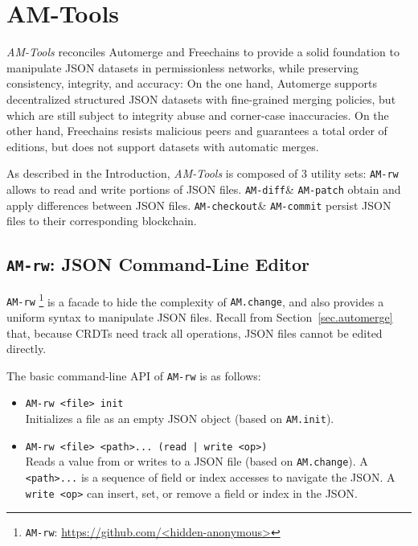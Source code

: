 \documentclass[12pt]{article}
\newcommand{\AMT}      {\emph{AM-Tools}\xspace}
\newcommand{\code}[1]  {\texttt{\footnotesize{#1}}}
\newcommand{\amrw}       {\code{AM-rw}\xspace}
\newcommand{\amdiff}     {\code{AM-diff}\xspace}
\newcommand{\ampatch}    {\code{AM-patch}\xspace}
\newcommand{\amcheckout} {\code{AM-checkout}\xspace}
\newcommand{\amcommit}   {\code{AM-commit}\xspace}
\begin{document}
\section{AM-Tools}
\label{sec.amtools}

\AMT reconciles Automerge and Freechains to provide a solid foundation to
manipulate JSON datasets in permissionless networks, while preserving
consistency, integrity, and accuracy:
%
On the one hand, Automerge supports decentralized structured JSON datasets with
fine-grained merging policies, but which are still subject to integrity abuse
and corner-case inaccuracies.
%
On the other hand, Freechains resists malicious peers and guarantees a total
order of editions, but does not support datasets with automatic merges.

As described in the Introduction, \AMT is composed of 3 utility sets:
\amrw allows to read and write portions of JSON files.
\amdiff \& \ampatch obtain and apply differences between JSON files.
\amcheckout \& \amcommit persist JSON files to their corresponding blockchain.

\subsection{\amrw: JSON Command-Line Editor}

\amrw%
    \footnote{\amrw: \url{https://github.com/<hidden-anonymous>}}
is a facade to hide the complexity of \code{AM.change}, and also provides a
uniform syntax to manipulate JSON files.
Recall from Section~\ref{sec.automerge} that, because CRDTs need track all
operations, JSON files cannot be edited directly.

The basic command-line API of \amrw is as follows:

\begin{itemize}
\item \code{AM-rw <file> init} \\
    Initializes a file as an empty JSON object (based on \code{AM.init}).
\item \code{AM-rw <file> <path>... (read | write <op>)} \\
    Reads a value from or writes to a JSON file (based on \code{AM.change}).
    A \code{<path>...} is a sequence of field or index accesses to navigate the
    JSON.
    A \code{write <op>} can insert, set, or remove a field or index in the
    JSON.
\end{itemize}
\end{document}
